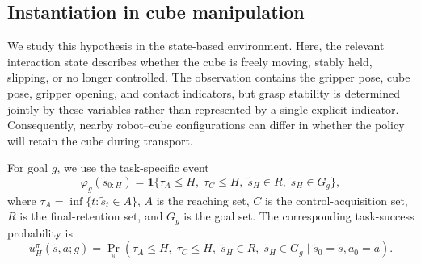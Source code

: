 \subsection{Instantiation in cube manipulation}

We study this hypothesis in the state-based \ogbench{} \task{} environment.
Here, the relevant interaction state describes whether the cube is freely moving, stably held, slipping, or no longer controlled.
The observation contains the gripper pose, cube pose, gripper opening, and contact indicators, but grasp stability is determined jointly by these variables rather than represented by a single explicit indicator.
Consequently, nearby robot--cube configurations can differ in whether the policy will retain the cube during transport.

For goal $g$, we use the task-specific event
\begin{equation}
    \varphi_g(\tilde{s}_{0:H}) = \mathbf{1}\{
        \tau_A\leq H,\;
        \tau_C\leq H,\;
        \tilde{s}_H\in R,\;
        \tilde{s}_H\in G_g
    \},
\end{equation}
where $\tau_A=\inf\{t:\tilde{s}_t\in A\}$, $A$ is the reaching set, $C$ is the control-acquisition set, $R$ is the final-retention set, and $G_g$ is the goal set.
The corresponding task-success probability is
\begin{equation}
    u^\pi_H(\tilde{s},a;g) = \Pr_\pi
    \left(
        \tau_A\leq H,\;
        \tau_C\leq H,\;
        \tilde{s}_H\in R,\;
        \tilde{s}_H\in G_g
        \mid
        \tilde{s}_0=\tilde{s},a_0=a
    \right).
\end{equation}